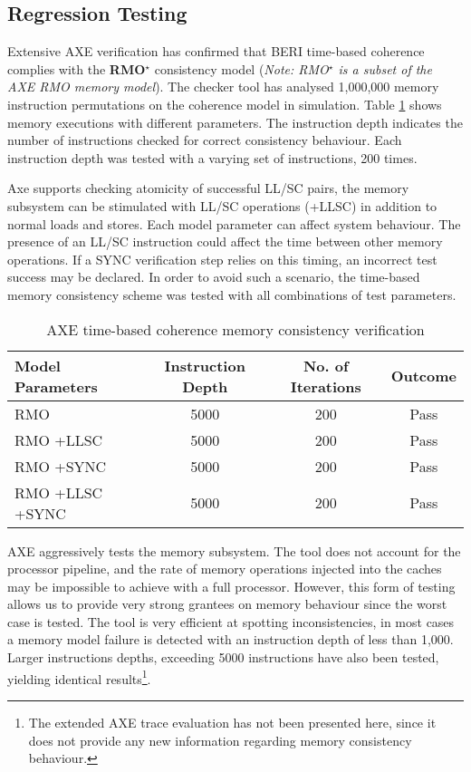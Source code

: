 	\subsection{Regression Testing}
		Extensive AXE verification has confirmed that BERI time-based coherence complies
		with the \textbf{RMO{\large$^\star$}} consistency model (\textit{Note: RMO{\large$^\star$} is a subset of the AXE RMO memory model}). The checker tool has analysed 1,000,000 memory instruction permutations on the coherence model in simulation. Table \ref{time_based_regression} shows memory executions with different parameters. The instruction depth indicates the number of instructions checked for correct consistency behaviour. Each instruction depth was tested with a varying set of instructions, 200 times.
		
		Axe supports checking atomicity of successful LL/SC pairs, the memory subsystem can be stimulated with LL/SC operations (+LLSC) in addition to normal loads and stores. Each model parameter can affect system behaviour. The presence of an LL/SC instruction could affect the time between other memory operations. If a SYNC verification step relies on this timing, an incorrect test success may be declared. In order to avoid such a scenario, the time-based memory consistency scheme was tested with all combinations of test parameters.

		\begin{table}[!b]	
		\begin{center}					
		\begin{tabular}{|l||c|c|c|}
			\hline
			Model Parameters & Instruction Depth & No. of Iterations & Outcome \\ 
			\hline 
			RMO & 5000 & 200 & Pass \\
			RMO +LLSC & 5000 & 200 & Pass \\
			RMO +SYNC & 5000 & 200 & Pass \\
			RMO +LLSC +SYNC & 5000 & 200 & Pass \\
			\hline
		\end{tabular}
		\caption{AXE time-based coherence memory consistency verification}
		\label{time_based_regression}
		\end{center} 
		\end{table}

		AXE aggressively tests the memory subsystem. The tool does not account for the processor pipeline, and the rate of memory operations injected into the caches may be impossible to achieve with a full processor. However, this form of testing allows us to provide very strong grantees on memory behaviour since the worst case is tested. The tool is very efficient at spotting inconsistencies, in most cases a memory model failure is detected with an instruction depth of less than 1,000. Larger instructions depths, exceeding 5000 instructions have also been tested, yielding identical results\footnote{The extended AXE trace evaluation has not been presented here, since it does not provide any new information regarding memory consistency behaviour.}.




